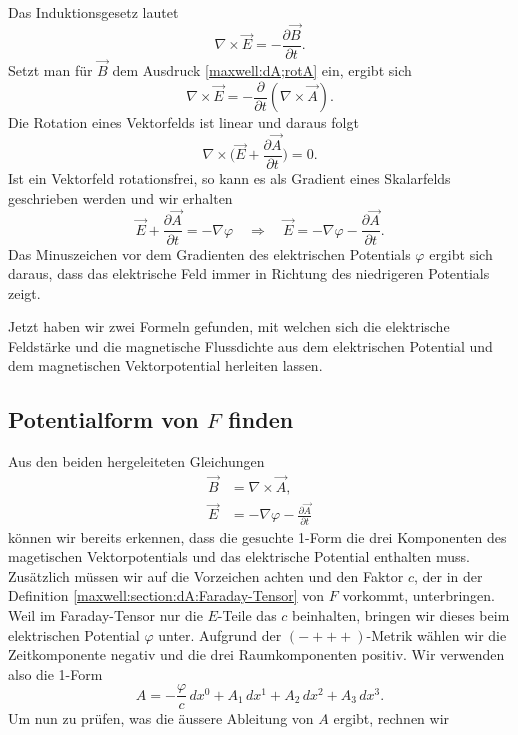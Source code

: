 Das Induktionsgesetz lautet
\begin{equation*}
	\nabla \times \vec{E} = - \frac{\partial \vec{B}}{\partial t}.
\end{equation*}
Setzt man für $\vec{B}$ dem Ausdruck \eqref{maxwell:dA;rotA} ein, ergibt sich
\begin{equation*}
	\nabla \times \vec{E} = - \frac{\partial}{\partial t}(\nabla \times \vec{A}).
\end{equation*}
Die Rotation eines Vektorfelds ist linear und daraus folgt
\begin{equation*}
	\nabla \times \biggl( \vec{E} + \frac{\partial \vec{A}}{\partial t}\biggr) = 0.
\end{equation*}
Ist ein Vektorfeld rotationsfrei, so kann es als Gradient eines Skalarfelds geschrieben werden und wir erhalten
\begin{equation}
	\label{maxwell:dA:defE}
	\vec{E} + \frac{\partial \vec{A}}{\partial t} = -\nabla \varphi \quad \Rightarrow \quad \vec{E} = -\nabla \varphi -\frac{\partial \vec{A}}{\partial t}.
\end{equation}
Das Minuszeichen vor dem Gradienten des elektrischen Potentials $\varphi$ ergibt sich daraus, dass das elektrische Feld immer in Richtung des niedrigeren Potentials zeigt.

Jetzt haben wir zwei Formeln gefunden, mit welchen sich die elektrische Feldstärke und die magnetische Flussdichte aus dem elektrischen Potential und dem magnetischen Vektorpotential herleiten lassen.
\subsection{Potentialform von $F$ finden}
Aus den beiden hergeleiteten Gleichungen
\begin{align*}
	\vec{B} &= \nabla \times \vec{A},\\
	\vec{E} &= -\nabla \varphi -\frac{\partial \vec{A}}{\partial t}
\end{align*}
können wir bereits erkennen, dass die gesuchte 1-Form die drei Komponenten des magetischen Vektorpotentials und das elektrische Potential enthalten muss.
Zusätzlich müssen wir auf die Vorzeichen achten und den Faktor $c$, der in der Definition \eqref{maxwell:section:dA:Faraday-Tensor} von $F$ vorkommt, unterbringen.
Weil im Faraday-Tensor nur die $E$-Teile das $c$ beinhalten, bringen wir dieses beim elektrischen Potential $\varphi$ unter.
Aufgrund der $({-}{+}{+}{+})$-Metrik wählen wir die Zeitkomponente negativ und die drei Raumkomponenten positiv.
Wir verwenden also die 1-Form 
\begin{equation}
	A = -\frac{\varphi}{c}\,dx^0 + A_1 \,dx^1 + A_2 \,dx^2 + A_3 \,dx^3.
\end{equation}
Um nun zu prüfen, was die äussere Ableitung von $A$ ergibt, rechnen wir

